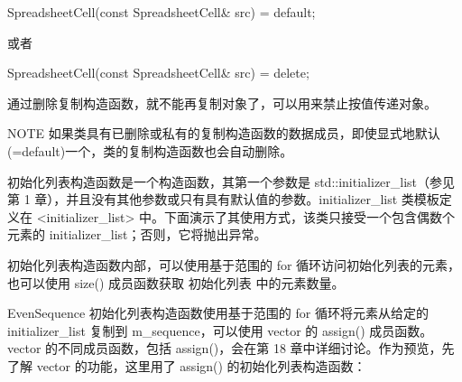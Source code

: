 \begin{cpp}
SpreadsheetCell(const SpreadsheetCell& src) = default;
\end{cpp}

或者

\begin{cpp}
SpreadsheetCell(const SpreadsheetCell& src) = delete;
\end{cpp}

通过删除复制构造函数，就不能再复制对象了，可以用来禁止按值传递对象。

\begin{myNotic}{NOTE}
如果类具有已删除或私有的复制构造函数的数据成员，即使显式地默认(=default)一个，类的复制构造函数也会自动删除。
\end{myNotic}


初始化列表构造函数是一个构造函数，其第一个参数是 std::initializer\_list（参见第 1 章），并且没有其他参数或只有具有默认值的参数。initializer\_list 类模板定义在 <initializer\_list> 中。下面演示了其使用方式，该类只接受一个包含偶数个元素的 initializer\_list；否则，它将抛出异常。


初始化列表构造函数内部，可以使用基于范围的 for 循环访问初始化列表的元素，也可以使用 size() 成员函数获取 初始化列表 中的元素数量。

EvenSequence 初始化列表构造函数使用基于范围的 for 循环将元素从给定的 initializer\_list 复制到 m\_sequence，可以使用 vector 的 assign() 成员函数。vector 的不同成员函数，包括 assign()，会在第 18 章中详细讨论。作为预览，先了解 vector 的功能，这里用了 assign() 的初始化列表构造函数：


